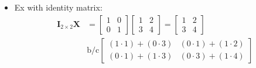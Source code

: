 \begin{itemize}
    \begin{itemize}
        \item Ex with identity matrix:
        \begin{align*}
            \bm{I}_{2 \times 2} \bm{X} & = 
            \begin{bmatrix}
                1 & 0 \\
                0 & 1
            \end{bmatrix}
            \begin{bmatrix}
                1 & 2 \\
                3 & 4
            \end{bmatrix} = 
            \begin{bmatrix}
                1 & 2 \\
                3 & 4
            \end{bmatrix} \\
            & 
            \text{b/c}
            \begin{bmatrix}
                (1 \cdot 1) + (0 \cdot 3) & (0 \cdot 1) + (1 \cdot 2) \\
                (0 \cdot 1) + (1 \cdot 3) & (0 \cdot 3) + (1 \cdot 4) 
            \end{bmatrix}
        \end{align*}
    \end{itemize}

\end{itemize}